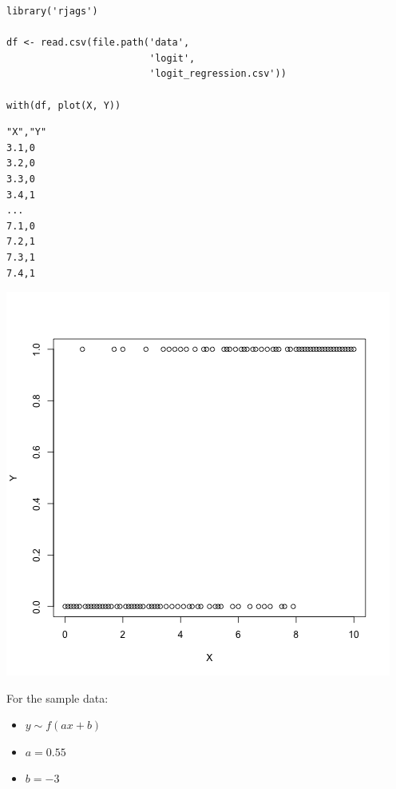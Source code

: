 \documentclass{beamer}
\begin{document}
\begin{frame}[fragile]
  \begin{verbatim}
library('rjags')

df <- read.csv(file.path('data',
                         'logit',
                         'logit_regression.csv'))

with(df, plot(X, Y))
  \end{verbatim}
\end{frame}

\begin{frame}[fragile]
  \begin{verbatim}
"X","Y"
3.1,0
3.2,0
3.3,0
3.4,1
...
7.1,0
7.2,1
7.3,1
7.4,1
  \end{verbatim}
\end{frame}

\begin{frame}[fragile]
  \begin{center}
    \includegraphics[scale = 0.4]{../graphs/logit/data_plot.png}
  \end{center}
\end{frame}

\begin{frame}
  For the sample data:
  \begin{itemize}
    \item{$y \sim f(ax + b)$}
    \item{$a = 0.55$}
    \item{$b = -3$}
  \end{itemize}
\end{frame}
\end{document}
